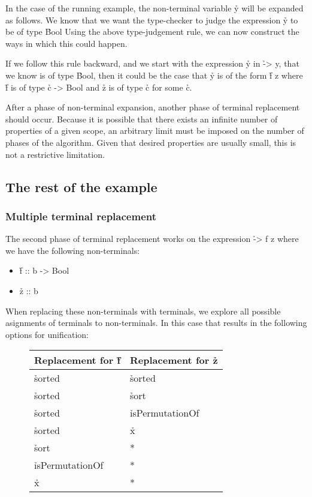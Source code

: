 \documentclass[a4paper, 11pt, onepage]{article}
\begin{document}
In the case of the running example, the non-terminal variable \h{y} will be expanded as follows.
We know that we want the type-checker to judge the expression \h{y} to be of type \h{Bool}
Using the above type-judgement rule, we can now construct the ways in which this could happen.

If we follow this rule backward, and we start with the expression \h{y} in \h{\x -> y}, that we know is of type \h{Bool}, then it could be the case that \h{y} is of the form \h{f z} where \h{f} is of type \h{c -> Bool} and \h{z} is of type \h{c} for some \h{c}.

After a phase of non-terminal expansion, another phase of terminal replacement should occur.
Because it is possible that there exists an infinite number of properties of a given scope, an arbitrary limit must be imposed on the number of phases of the algorithm.
Given that desired properties are usually small, this is not a restrictive limitation.


\subsection{The rest of the example}

\subsubsection{Multiple terminal replacement}

The second phase of terminal replacement works on the expression \h{\x -> f z} where we have the following non-terminals:

\begin{itemize}
  \item \h{f :: b -> Bool}
  \item \h{z :: b}
\end{itemize}

When replacing these non-terminals with terminals, we explore all possible asignments of terminals to non-terminals.
In this case that results in the following options for unification:

\begin{figure}[H]
  \centering
  \begin{tabular}{|l|l|}
    \hline
    Replacement for \h{f} & Replacement for \h{z} \\
    \hline
    \hline
    \h{sorted}            & \h{sorted}          \\
    \hline
    \h{sorted}            & \h{sort}            \\
    \hline
    \h{sorted}            & \h{isPermutationOf} \\
    \hline
    \h{sorted}            & \h{x}               \\
    \hline
    \h{sort}              & *                   \\
    \hline
    \h{isPermutationOf}   & *                   \\
    \hline
    \h{x}                 & *                   \\
    \hline
  \end{tabular}
\end{figure}
\end{document}
